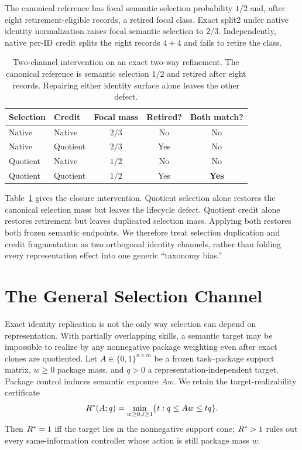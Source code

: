 The canonical reference has focal semantic selection probability $1/2$ and, after eight retirement-eligible records, a retired focal class. Exact split2 under native identity normalization raises focal semantic selection to $2/3$. Independently, native per-ID credit splits the eight records $4+4$ and fails to retire the class.

\begin{table}[t]
\centering
\caption{Two-channel intervention on an exact two-way refinement. The canonical reference is semantic selection $1/2$ and retired after eight records. Repairing either identity surface alone leaves the other defect.}
\label{tab:2x2}
\small
\setlength{\tabcolsep}{4pt}
\begin{tabular}{llccc}
\toprule
Selection & Credit & Focal mass & Retired? & Both match?\\
\midrule
Native & Native & $2/3$ & No & No\\
Native & Quotient & $2/3$ & Yes & No\\
Quotient & Native & $1/2$ & No & No\\
Quotient & Quotient & $1/2$ & Yes & \textbf{Yes}\\
\bottomrule
\end{tabular}
\end{table}

Table~\ref{tab:2x2} gives the closure intervention. Quotient selection alone restores the canonical selection mass but leaves the lifecycle defect. Quotient credit alone restores retirement but leaves duplicated selection mass. Applying both restores both frozen semantic endpoints. We therefore treat selection duplication and credit fragmentation as two orthogonal identity channels, rather than folding every representation effect into one generic ``taxonomy bias.''

\section{The General Selection Channel}
\label{sec:selection-geometry}

Exact identity replication is not the only way selection can depend on representation. With partially overlapping skills, a semantic target may be impossible to realize by any nonnegative package weighting even after exact clones are quotiented. Let $A\in\{0,1\}^{n\times m}$ be a frozen task--package support matrix, $w\ge0$ package mass, and $q>0$ a representation-independent target. Package control induces semantic exposure $Aw$. We retain the target-realizability certificate
\begin{equation}
R^*(A;q)=\min_{w\ge0,t\ge1}\{t:q\le Aw\le tq\}.
\end{equation}
Then $R^*=1$ iff the target lies in the nonnegative support cone; $R^*>1$ rules out every same-information controller whose action is still package mass $w$.


